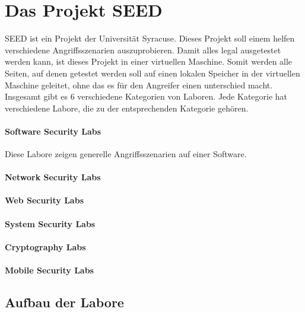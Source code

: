 \chapter{Das Projekt SEED}
SEED ist ein Projekt der Universität Syracuse. Dieses Projekt soll einem helfen verschiedene Angriffsszenarien auszuprobieren. Damit alles legal ausgetestet werden kann, ist dieses Projekt in einer virtuellen Maschine. Somit werden alle Seiten, auf denen getestet werden soll auf einen lokalen Speicher in der virtuellen Maschine geleitet, ohne das es für den Angreifer einen unterschied macht. \\
Insgesamt gibt es 6 verschiedene Kategorien von Laboren. Jede Kategorie hat verschiedene Labore, die zu der entsprechenden Kategorie gehören.
\subsubsection{Software Security Labs}
Diese Labore zeigen generelle Angriffsszenarien auf einer Software. 
\subsubsection{Network Security Labs}
\subsubsection{Web Security Labs}
\subsubsection{System Security Labs}
\subsubsection{Cryptography Labs}
\subsubsection{Mobile Security Labs}
\section{Aufbau der Labore}